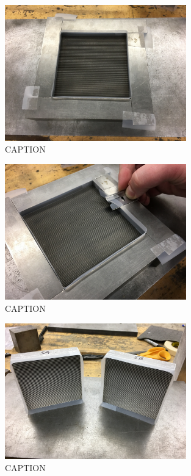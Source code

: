 \begin{figure}
	\centering
        \includegraphics[width=0.7\textwidth]{appendix_sample_prep/dds_trim_setup.jpg}
   	\caption{CAPTION}
  	\label{Fig:dds_trim_setup}
\end{figure}

\begin{figure}
	\centering
        \includegraphics[width=0.7\textwidth]{appendix_sample_prep/dds_tape_trim.jpg}
   	\caption{CAPTION}
  	\label{Fig:dds_tape_trim}
\end{figure}

\begin{figure}
	\centering
        \includegraphics[width=0.7\textwidth]{appendix_sample_prep/dds_blocks_labeled.jpg}
   	\caption{CAPTION}
  	\label{Fig:dds_blocks_labeled}
\end{figure}

